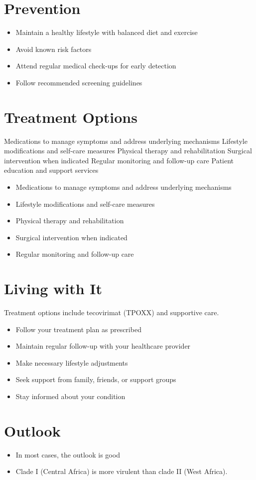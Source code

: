 \section{Prevention}
\begin{itemize}[noitemsep]
  \item Maintain a healthy lifestyle with balanced diet and exercise
  \item Avoid known risk factors
  \item Attend regular medical check-ups for early detection
  \item Follow recommended screening guidelines
\end{itemize}
\section{Treatment Options}
Medications to manage symptoms and address underlying mechanisms Lifestyle modifications and self-care measures Physical therapy and rehabilitation Surgical intervention when indicated Regular monitoring and follow-up care Patient education and support services

\begin{itemize}[noitemsep]
  \item Medications to manage symptoms and address underlying mechanisms
  \item Lifestyle modifications and self-care measures
  \item Physical therapy and rehabilitation
  \item Surgical intervention when indicated
  \item Regular monitoring and follow-up care
\end{itemize}
\section{Living with It}
Treatment options include tecovirimat (TPOXX) and supportive care.

\begin{itemize}[noitemsep]
  \item Follow your treatment plan as prescribed
  \item Maintain regular follow-up with your healthcare provider
  \item Make necessary lifestyle adjustments
  \item Seek support from family, friends, or support groups
  \item Stay informed about your condition
\end{itemize}
\section{Outlook}
\begin{itemize}[noitemsep]
  \item In most cases, the outlook is good
  \item Clade I (Central Africa) is more virulent than clade II (West Africa).
\end{itemize}
